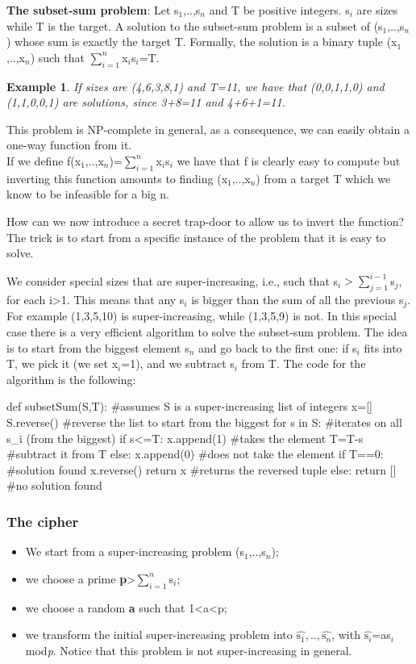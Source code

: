 \documentclass[a4paper, 12pt]{report}
\newtheorem{example}{\textbf{Example}}
\begin{document}
\textbf{The subset-sum problem}: Let s$_1$,..,s$_n$ and T be positive integers. s$_i$ are sizes while T is the target. A solution to the subset-sum problem is a subset of (s$_1$,..,s$_n$) whose sum is exactly the target T. Formally, the solution is a binary tuple (x$_1$,..,x$_n$) such that $\sum_{i=1}^{n}$x$_i$s$_i$=T.

\begin{example}
	If sizes are (4,6,3,8,1) and T=11, we have that (0,0,1,1,0) and (1,1,0,0,1) are solutions, since 3+8=11 and 4+6+1=11.
\end{example}

This problem is NP-complete in general, as a consequence, we can easily obtain a one-way function from it.\\
If we define f(x$_1$,..,x$_n$)=$\sum_{i=1}^{n}$x$_i$s$_i$ we have that f is clearly easy to compute but inverting this function amounts to finding (x$_1$,..,x$_n$) from a target T which we know to be infeasible for a big n.

How can we now introduce a secret trap-door to allow us to invert the function? The trick is to start from a specific instance of the problem that it is easy to solve.

We consider special sizes that are super-increasing, i.e., such that s$_i>\sum_{j=1}^{i-1}$s$_j$, for each i>1. This means that any s$_i$ is bigger than the sum of all the previous s$_j$. For example (1,3,5,10) is super-increasing, while (1,3,5,9) is not. In this special case there is a very efficient algorithm to solve the subset-sum problem. The idea is to start from the biggest element s$_n$ and go back to the first one: if s$_i$ fits into T, we pick it (we set x$_i$=1), and we subtract s$_i$ from T. The code for the algorithm is the following:

\begin{python}
	def subsetSum(S,T):			#assumes S is a super-increasing list of integers
		x=[]
		S.reverse()						#reverse the list to start from the biggest
		for s in S:						#iterates on all s_i (from the biggest)
			if s<=T:
				x.append(1) 			#takes the element
				T=T-s							#subtract it from T
			else:
				x.append(0)				#does not take the element
		if T==0:							#solution found
			x.reverse()
			return x						#returns the reversed tuple
		else:
			return []						#no solution found
\end{python}

\subsubsection{The cipher}
\begin{itemize}
	\item We start from a super-increasing problem (s$_1$,..,s$_n$);
	\item we choose a prime \textbf{p}>$\sum_{i=1}^{n}$s$_i$;
	\item we choose a random \textbf{a} such that 1<a<p;
	\item we transform the initial super-increasing problem into $\hat{\text{s}_1},..,\hat{\text{s}_n}$, with $\hat{\text{s}_i}$=as$_i$ mod\textit{p}. Notice that this problem is not super-increasing in general.
\end{itemize}
\end{document}
